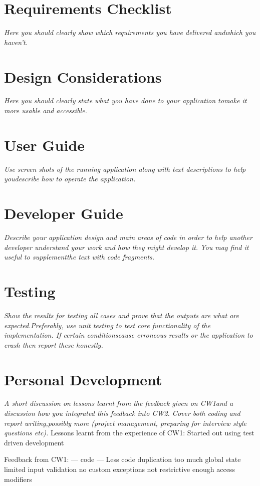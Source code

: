 \documentclass[11pt]{article}
\begin{document}
\section{Requirements Checklist}
\emph{Here you should clearly show which requirements you have delivered andwhich you haven’t.}

\section{Design Considerations}
\emph{Here you should clearly state what you have done to your application tomake it more usable and accessible.}

\section{User Guide}
\emph{Use screen shots of the running application along with text descriptions to help youdescribe how to operate the application.}

\section{Developer Guide}
\emph{Describe your application design and main areas of code in order to help another developer understand your work and how they might develop it. You may find it useful to supplementthe text with code fragments.}

\section{Testing}
\emph{Show  the  results  for  testing  all  cases  and  prove  that  the  outputs  are  what  are  expected.Preferably,  use  unit  testing  to  test  core  functionality  of  the  implementation.   If  certain  conditionscause erroneous results or the application to crash then report these honestly.}

\section{Personal Development}
\emph{A short discussion on lessons learnt from the feedback given on CW1and a discussion how you integrated this feedback into CW2.  Cover both coding and report writing,possibly more (project management, preparing for interview style questions etc).}
Lessons learnt from the experience of CW1:
Started out using test driven development


Feedback from CW1:
 --- code ---
Less code duplication
too much global state
limited input validation
no custom exceptions
not restrictive enough access modifiers
\end{document}
